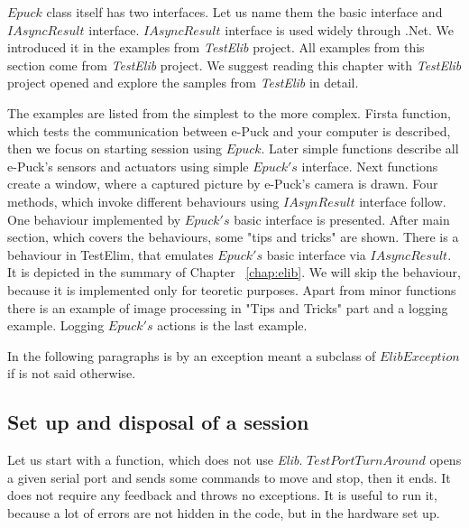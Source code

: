   $Epuck$ class itself has two interfaces. Let us name them the basic interface and $IAsyncResult$ interface.
  $IAsyncResult$ interface is used widely through .Net. We introduced it in the examples from {\it TestElib} project.
  All examples from this section come from {\it TestElib} project. We suggest reading this chapter with {\it TestElib} project opened
  and explore the samples from {\it TestElib} in detail.

  The examples are listed from the simplest to the more complex. 
  Firsta function, which tests the communication between e-Puck and your computer is described,
  then we focus on starting session using $Epuck$.
  Later simple functions describe all e-Puck's sensors and actuators using simple $Epuck's$ interface.
  Next functions create a window, where a captured picture by e-Puck's camera is drawn.
  Four methods, which invoke different behaviours using $IAsynResult$ interface follow.
  One behaviour implemented by $Epuck's$ basic interface is presented.
  After main section, which covers the behaviours, some "tips and tricks" are shown.
  There is a behaviour in TestElim, that emulates $Epuck's$ basic interface via $IAsyncResult$. 
  It is depicted in the summary of Chapter ~\ref{chap:elib}.
  We will skip the behaviour, because it is implemented only for teoretic purposes.
  Apart from minor functions there is an example of image processing in "Tips and Tricks" part and a logging example.
  Logging $Epuck's$ actions is the last example.

  In the following paragraphs is by an exception meant a subclass of $ElibException$ if is not said otherwise.
\subsection{Set up and disposal of a session}\label{sec:session}
  Let us start with a function, which does not use {\it Elib}. $TestPortTurnAround$ opens a given serial port
  and sends some commands to move and stop, then it ends. It does not require any feedback and throws no exceptions.
  It is useful to run it, because a lot of errors are not hidden in the code, but in the hardware set up.

